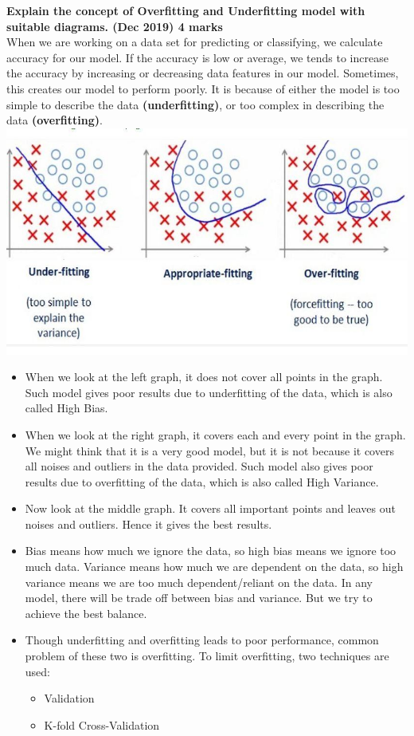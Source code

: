 
\textbf{\textcolor{LightMagenta}{Explain the concept of Overfitting and Underfitting model with suitable diagrams. (Dec 2019) \hfill 4 marks}} \\[5pt]
When we are working on a data set for predicting or classifying, we calculate accuracy for our model. If the accuracy is low or average, we tends to increase the accuracy by increasing or decreasing data features in our model. Sometimes, this creates our model to perform poorly. It is because of either the model is too simple to describe the data \textbf{(underfitting)}, or too complex in describing the data \textbf{(overfitting)}.\\
\includegraphics[scale=0.65]{Images/A36_img2.jpg}
\begin{itemize}
    \item When we look at the left graph, it does not cover all points in the graph. Such model gives poor results due to underfitting of the data, which is also called High Bias. 
    \item When we look at the right graph, it covers each and every point in the graph. We might think that it is a very good model, but it is not because it covers all noises and outliers in the data provided. Such model also gives poor results due to overfitting of the data, which is also called High Variance. 
    \item Now look at the middle graph. It covers all important points and leaves out noises and outliers. Hence it gives the best results.
    \item Bias means how much we ignore the data, so high bias means we ignore too much data. Variance means how much we are dependent on the data, so high variance means we are too much dependent/reliant on the data. In any model, there will be trade off between bias and variance. But we try to achieve the best balance.
    \item Though underfitting and overfitting leads to poor performance, common problem of these two is overfitting. To limit overfitting, two techniques are used:
    \begin{itemize}
        \item Validation
        \item K-fold Cross-Validation
    \end{itemize}
\end{itemize} \\